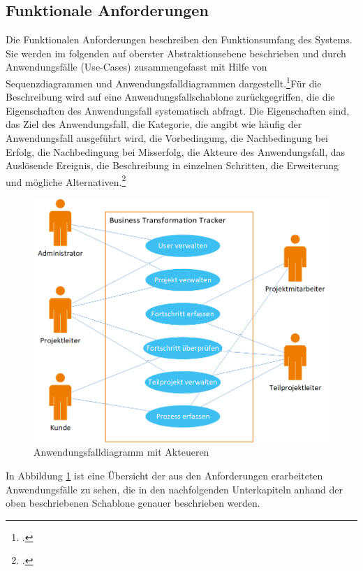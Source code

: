 \subsection{Funktionale Anforderungen}
Die Funktionalen Anforderungen beschreiben den Funktionsumfang des Systems. Sie werden im folgenden auf oberster Abstraktionsebene beschrieben und durch Anwendungsfälle (Use-Cases) zusammengefasst mit Hilfe von Sequenzdiagrammen und Anwendungsfalldiagrammen dargestellt.\footcite[Vgl.][S. 496]{balzert}Für die Beschreibung wird auf eine Anwendungsfallschablone zurückgegriffen, die die Eigenschaften des Anwendungsfall systematisch abfragt. Die Eigenschaften sind, das Ziel des Anwendungsfall, die Kategorie, die angibt wie häufig der Anwendungsfall ausgeführt wird, die Vorbedingung, die Nachbedingung bei Erfolg, die Nachbedingung bei Misserfolg, die Akteure des Anwendungsfall, das Auslösende Ereignis, die Beschreibung in einzelnen Schritten, die Erweiterung und mögliche Alternativen.\footcite[Vgl.][S. 261]{balzert}
\begin{figure}[h]
    \centering
    \includegraphics[scale=0.67]{./Bilder/Anwendungsfalldiagramm.png}
    \caption[Anwendungsfalldiagramm]{Anwendungsfalldiagramm mit Akteueren}
    \label{fig:Anwendungsfalldiagramm}
\end{figure}
In Abbildung \ref{fig:Anwendungsfalldiagramm} ist eine Übersicht der aus den Anforderungen erarbeiteten Anwendungsfälle zu sehen, die in den nachfolgenden Unterkapiteln anhand der oben beschriebenen Schablone genauer beschrieben werden.

